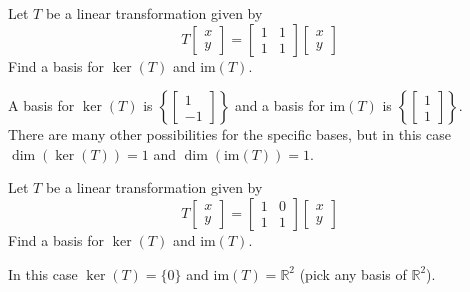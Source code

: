 \documentclass{ximera}
\begin{document}
\begin{problem}\label{prb:6.28}
 Let $T$ be a linear transformation given by
\[
T \left[ \begin{array}{r}
x\\
y
\end{array}\right] = \left[ \begin{array}{rrr}
1 &1  \\
1 & 1
\end{array}\right]
\left[ \begin{array}{r}
x\\
y
\end{array}\right]
\]
Find a basis for $\ker \left( T\right)$ and $\mbox{im} \left( T\right) $.

\begin{hint}
A basis for $\ker \left( T\right)$ is
$\left\{ \left[
\begin{array}{r}
1 \\
-1
\end{array}
\right] \right\}$
and a basis for $\mbox{im} \left( T\right)$ is
$\left\{ \left[
\begin{array}{r}
1 \\
1
\end{array}
\right] \right\}$. \\
There are many other possibilities for the specific bases, but in this case
$\dim \left( \ker \left( T\right) \right)=1 $ and $\dim \left( \mbox{im} \left( T\right) \right)=1$.
\end{hint}

\end{problem}


\begin{problem}\label{prb:6.29}
 Let $T$ be a linear transformation given by
\[
T \left[ \begin{array}{r}
x\\
y
\end{array}\right] = \left[ \begin{array}{rrr}
1 & 0  \\
1 & 1
\end{array}\right]
\left[ \begin{array}{r}
x\\
y
\end{array}\right]
\]
Find a basis for $\ker \left( T\right)$ and $\mbox{im}
\left( T\right) $.

\begin{hint}
In this case $\ker \left( T\right) =\{0\}$
and $\mbox{im} \left( T\right) = \mathbb{R}^2$ (pick any basis of $\mathbb{R}^2$).
\end{hint}

\end{problem}
\end{document}
